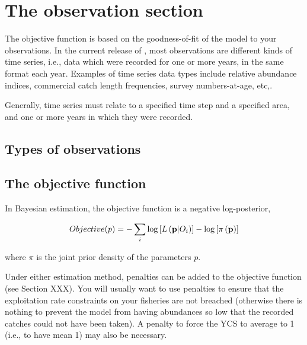 \section{The observation section\label{sec:observation-section}}

The objective function is based on the goodness-of-fit of the model to your observations. In the current release of \SPM, most observations are different kinds of time series, i.e., data which were recorded for one or more years, in the same format each year. Examples of time series data types include relative abundance indices, commercial catch length frequencies, survey numbers-at-age, etc,. 

Generally, time series must relate to a specified time step and a specified area, and one or more years in which they were recorded.

\subsection{Types of observations}

\subsection{The objective function}

In Bayesian estimation, the objective function is a negative log-posterior,

\[
Objective(p)= - \sum\limits_i {\log \left[ {L\left( {{\bf{p}}|O_i } \right)} \right]}  - \log \left[ {\pi \left( {\bf{p}} \right)} \right]
\]

where $\pi$ is the joint prior density of the parameters $p$.

Under either estimation method, penalties can be added to the objective function (see Section XXX). You will usually want to use penalties to ensure that the exploitation rate constraints on your fisheries are not breached (otherwise there is nothing to prevent the model from having abundances so low that the recorded catches could not have been taken). A penalty to force the YCS to average to 1 (i.e., to have mean 1) may also be necessary.
